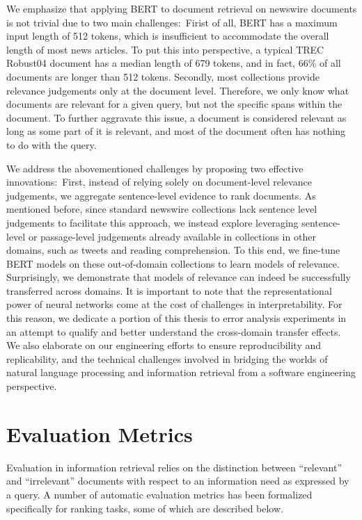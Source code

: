 We emphasize that applying BERT to document retrieval on newswire documents is not trivial due to two main challenges:\
Firist of all, BERT has a maximum input length of 512 tokens, which is insufficient to accommodate the overall length of most news articles.
To put this into perspective, a typical TREC Robust04 document has a median length of 679 tokens, and in fact, 66\% of all documents are longer than 512 tokens.
Secondly, most collections provide relevance judgements only at the document level.
Therefore, we only know what documents are relevant for a given query, but not the specific spans within the document.
To further aggravate this issue, a document is considered relevant as long as some part of it is relevant, and most of the document often has nothing to do with the query.

We address the abovementioned challenges by proposing two effective innovations:\
First, instead of relying solely on document-level relevance judgements, we aggregate sentence-level evidence to rank documents.
As mentioned before, since standard newswire collections lack sentence level judgements to facilitate this approach, we instead explore leveraging sentence-level or passage-level judgements already available in collections in other domains, such as tweets and reading comprehension.
To this end, we fine-tune BERT models on these out-of-domain collections to learn models of relevance.
Surprisingly, we demonstrate that models of relevance can indeed be successfully transferred across domains.
It is important to note that the representational power of neural networks come at the cost of challenges in interpretability.
For this reason, we dedicate a portion of this thesis to error analysis experiments in an attempt to qualify and better understand the cross-domain transfer effects.
We also elaborate on our engineering efforts to ensure reproducibility and replicability, and the technical challenges involved in bridging the worlds of natural language processing and information retrieval from a software engineering perspective.

\section{Evaluation Metrics}

Evaluation in information retrieval relies on the distinction between ``relevant'' and ``irrelevant'' documents with respect to an information need as expressed by a query.
A number of automatic evaluation metrics has been formalized specifically for ranking tasks, some of which are described below.

